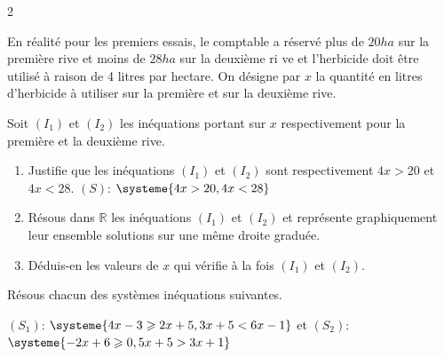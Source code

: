 \begin{multicols*}{2}
  	
  	En réalité pour les premiers essais, le comptable a réservé plus de $20 ha$ sur la première rive et moins de $28 ha$ sur la deuxième ri	ve et l'herbicide doit être utilisé à raison de 4 litres par hectare. On désigne par $x$ la quantité en litres d'herbicide à utiliser sur la première et sur la deuxième rive. 
  	
  	Soit $(I_{1})$ et $(I_{2})$ les inéquations portant sur $x$ respectivement pour la première et la deuxième rive.
  	
  	
  	\begin{enumerate}
  		\item Justifie que les inéquations $(I_{1})$ et $(I_{2})$ sont respectivement $4x>20$ et $4x<28$.
  		 $(S)$: $\systeme{4x > 20,4x < 28}$
  		
  		\item Résous dans $\mathbb{R}$ les inéquations $(I_{1})$ et $(I_{2})$  et représente graphiquement leur ensemble solutions sur une même droite graduée.
  		\item Déduis-en les valeurs de $x$ qui vérifie à la fois $(I_{1})$ et $(I_{2})$.
  		
  	\end{enumerate}
  	
  	\dures
  	  
  	
  	Résous chacun des systèmes inéquations suivantes.
  	
  	$(S_{1})$: $\systeme{4x-3 \geqslant 2x+5,3x+5 < 6x-1}$ et  $(S_{2})$: $\systeme{-2x +6\geqslant 0, 5x+5>3x+1}$
  	\dures
  	 
  	

\end{multicols*}
